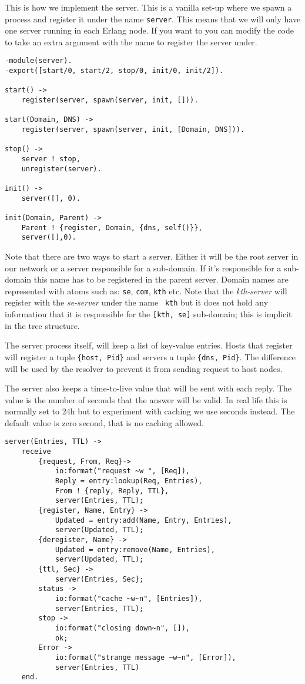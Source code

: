 \documentclass[a4paper, 11pt]{article}
\begin{document}
This is how we implement the server. This is a vanilla set-up where we
spawn a process and register it under the name {\tt server}. This
means that we will only have one server running in each Erlang
node. If you want to you can modify the code to take an extra argument
with the name to register the server under. 

\begin{verbatim}
-module(server).
-export([start/0, start/2, stop/0, init/0, init/2]).

start() ->
    register(server, spawn(server, init, [])).    

start(Domain, DNS) ->
    register(server, spawn(server, init, [Domain, DNS])).

stop() ->
    server ! stop,
    unregister(server).
	    
init() ->
    server([], 0).

init(Domain, Parent) ->
    Parent ! {register, Domain, {dns, self()}},
    server([],0).

\end{verbatim}

Note that there are two ways to start a server. Either it will be the
root server in our network or a server responsible for a
sub-domain. If it's responsible for a sub-domain this name has to be
registered in the parent server. Domain names are represented with
atoms such as: {\tt se}, {\tt com}, {\tt kth} etc. Note that the {\em
kth-server} will register with the {\em se-server} under the name {\tt
kth} but it does not hold any information that it is responsible for
the {\tt [kth, se]} sub-domain; this is implicit in the tree
structure.

The server process itself, will keep a list of key-value
entries. Hosts that register will register a tuple {\tt \{host, Pid\}}
and servers a tuple {\tt \{dns, Pid\}}.  The difference will be used
by the resolver to prevent it from sending request to host nodes. 

The server also keeps a time-to-live value that will be sent with each
reply. The value is the number of seconds that the answer will be
valid. In real life this is normally set to 24h but to experiment with
caching we use seconds instead. The default value is zero second, that
is no caching allowed.

\begin{verbatim}
server(Entries, TTL) ->
    receive 
        {request, From, Req}->
            io:format("request ~w ", [Req]),
            Reply = entry:lookup(Req, Entries),
            From ! {reply, Reply, TTL},
            server(Entries, TTL);
        {register, Name, Entry} ->
            Updated = entry:add(Name, Entry, Entries),
            server(Updated, TTL);
        {deregister, Name} ->
            Updated = entry:remove(Name, Entries),
            server(Updated, TTL);
        {ttl, Sec} ->
            server(Entries, Sec};
        status ->
            io:format("cache ~w~n", [Entries]),            
            server(Entries, TTL);
        stop ->
            io:format("closing down~n", []),            
            ok;
        Error ->
            io:format("strange message ~w~n", [Error]),
            server(Entries, TTL)
    end.
\end{verbatim}
\end{document}
